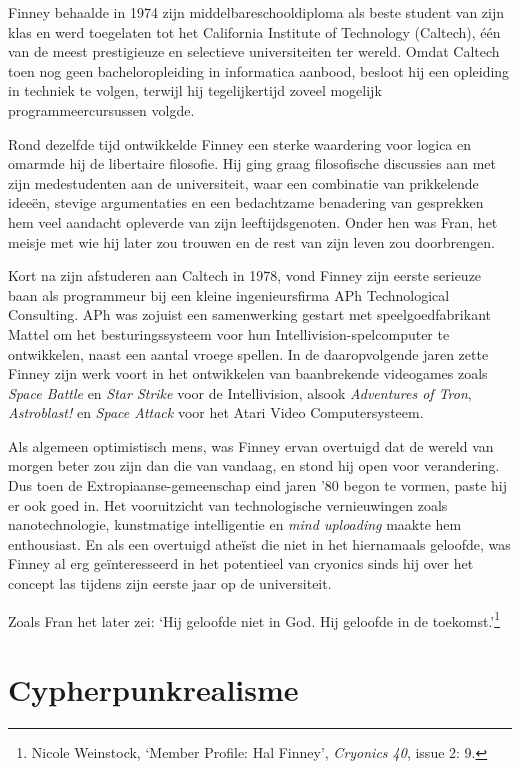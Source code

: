 \documentclass[smalldemyvopaper,11pt,twoside,onecolumn,openright,extrafontsizes,hidelinks]{memoir}
\begin{document}
Finney behaalde in 1974 zijn middelbareschooldiploma als beste student
van zijn klas en werd toegelaten tot het California Institute of
Technology (Caltech), één van de meest prestigieuze en selectieve
universiteiten ter wereld. Omdat Caltech toen nog geen bacheloropleiding
in informatica aanbood, besloot hij een opleiding in techniek te volgen,
terwijl hij tegelijkertijd zoveel mogelijk programmeercursussen volgde.

Rond dezelfde tijd ontwikkelde Finney een sterke waardering voor logica
en omarmde hij de libertaire filosofie. Hij ging graag filosofische
discussies aan met zijn medestudenten aan de universiteit, waar een
combinatie van prikkelende ideeën, stevige argumentaties en een
bedachtzame benadering van gesprekken hem veel aandacht opleverde van
zijn leeftijdsgenoten. Onder hen was Fran, het meisje met wie hij later
zou trouwen en de rest van zijn leven zou doorbrengen.

Kort na zijn afstuderen aan Caltech in 1978, vond Finney zijn eerste
serieuze baan als programmeur bij een kleine ingenieursfirma APh
Technological Consulting. APh was zojuist een samenwerking gestart met
speelgoedfabrikant Mattel om het besturingssysteem voor hun
Intellivision-spelcomputer te ontwikkelen, naast een aantal vroege
spellen. In de daaropvolgende jaren zette Finney zijn werk voort in het
ontwikkelen van baanbrekende videogames zoals \emph{Space Battle} en
\emph{Star Strike} voor de Intellivision, alsook \emph{Adventures of
Tron}, \emph{Astroblast!} en \emph{Space Attack} voor het Atari Video
Computersysteem.

Als algemeen optimistisch mens, was Finney ervan overtuigd dat de wereld
van morgen beter zou zijn dan die van vandaag, en stond hij open voor
verandering. Dus toen de Extropiaanse-gemeenschap eind jaren '80 begon
te vormen, paste hij er ook goed in. Het vooruitzicht van technologische
vernieuwingen zoals nanotechnologie, kunstmatige intelligentie en
\emph{mind uploading} maakte hem enthousiast. En als een overtuigd
atheïst die niet in het hiernamaals geloofde, was Finney al erg
geïnteresseerd in het potentieel van cryonics sinds hij over het concept
las tijdens zijn eerste jaar op de universiteit.

Zoals Fran het later zei: `Hij geloofde niet in God. Hij geloofde in de
toekomst.'\footnote{Nicole Weinstock, `Member Profile: Hal Finney',
  \emph{Cryonics 40}, issue 2: 9.}

\section{Cypherpunkrealisme}\label{cypherpunkrealisme}
\end{document}
